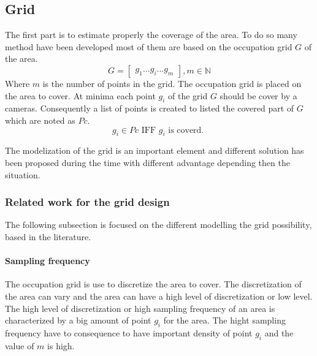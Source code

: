 \subsection{Grid}\label{sec:Grid}



The first part is to estimate properly the coverage of the area. To do so many method have been developed most of them are based on the occupation grid $G$ of the area. 
\begin{equation}\label{eq:Grid}
	G=\begin{bmatrix}
	 	g_1 ...g_i ... g_m
	\end{bmatrix}  , m\in \mathbb{N}
\end{equation}
Where $m$ is the number of points in the grid.
The occupation grid is placed on the area to cover. At minima each point $g_i$ of the grid $G$ should be cover by a cameras. Consequently a list of points is created to listed the covered part of $G$ which are noted as $Pc$.
\begin{equation}\label{eq:Pci}
g_i \in Pc \mbox{ IFF } g_i \mbox{ is coverd. }
\end{equation}


The modelization of the grid is an important element and different solution has been proposed during the time with different advantage depending then the situation.\\

\subsubsection*{Related work for the grid design}
The following subsection is focused on the different  modelling the grid possibility, based in the literature. 

\paragraph*{ Sampling frequency} %
The occupation grid is use to discretize the area to cover. The discretization of the area can vary and the area can have a high level of discretization or low level. 
The high level of discretization or high sampling frequency of an area is characterized by a big amount of point $g_i$ for the area. The hight sampling frequency have to consequence to have important density of point $g_i$ and the value of $m$ is high. 

